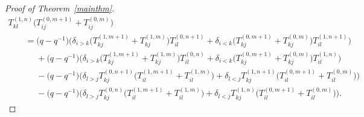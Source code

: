 \documentclass[pdftex]{sigma}
\numberwithin{theorem}{section}
\numberwithin{proposition}{section}
\numberwithin{lemma}{section}
\numberwithin{corollary}{section}
\numberwithin{definition}{section}
\numberwithin{example}{section}
\numberwithin{remark}{section}
\numberwithin{note}{section}
\numberwithin{equation}{section}
\begin{document}
\begin{proof}[Proof of Theorem~\ref{mainthm}]
\begin{gather*}
T_{kl}^{(1,n)} \big(T_{ij}^{(0,m+1)} + T_{ij}^{(0,m)}\big)
\\
\qquad
  = \big(q-q^{-1}\big) \Big(\delta_{i>k} \big(T_{kj}^{(1,m+1)} + T_{kj}^{(1,m)}\big) T_{il}^{(0,n+1)} + \delta_{i<k}
\big(T_{kj}^{(0,m+1)} + T_{kj}^{(0,m)}\big) T_{il}^{(1,n+1)} \Big)
\\
\qquad\phantom{=}{}
+ \big(q-q^{-1}\big) \Big(\delta_{i>k} \big(T_{kj}^{(1,m+1)} + T_{kj}^{(1,m)}\big) T_{il}^{(0,n)} + \delta_{i<k}
\big(T_{kj}^{(0,m+1)} + T_{kj}^{(0,m)}\big) T_{il}^{(1,n)}\Big)
\\
\qquad\phantom{=}{}
- \big(q-q^{-1}\big) \Big(\delta_{l>j} T_{kj}^{(0,n+1)} \big(T_{il}^{(1,m+1)} + T_{il}^{(1,m)}\big) + \delta_{l<j}
T_{kj}^{(1,n+1)} \big(T_{il}^{(0,m+1)} + T_{il}^{(0,m)}\big) \Big)
\\
\qquad\phantom{=}{}
- \big(q-q^{-1}\big) \Big(\delta_{l>j} T_{kj}^{(0,n)} \big(T_{il}^{(1,m+1)} + T_{il}^{(1,m)}\big) + \delta_{l<j} T_{kj}^{(1,n)}
\big(T_{il}^{(0,m+1)} + T_{il}^{(0,m)}\big) \Big).
\end{gather*}


\end{proof}
\end{document}
